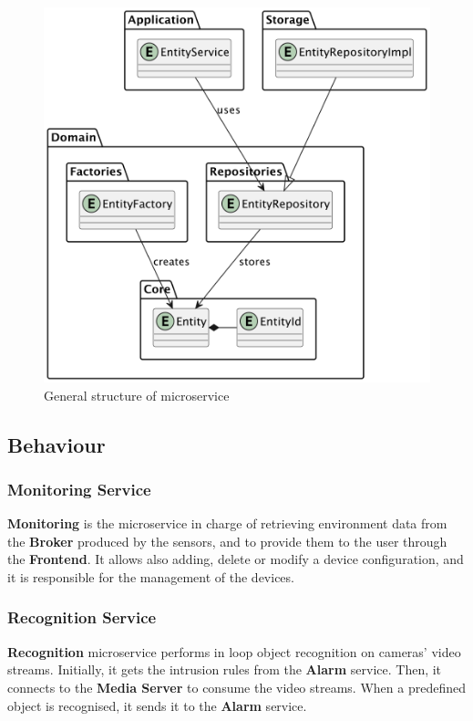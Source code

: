 \documentclass{scrartcl}
\begin{document}
    \begin{figure}
        \centering
        \includegraphics[scale=0.55]{img/general-structure}
        \caption{General structure of microservice}
        \label{fig:general-structure}
    \end{figure}

    \subsection{Behaviour}

    \subsubsection{Monitoring Service}

    \textbf{Monitoring} is the microservice in charge of retrieving environment data from the \textbf{Broker} produced by the sensors,
    and to provide them to the user through the \textbf{Frontend}.
    It allows also adding, delete or modify a device configuration, and it is responsible for the management of the devices.

    \subsubsection{Recognition Service}

    \textbf{Recognition} microservice performs in loop object recognition on cameras' video streams.
    Initially, it gets the intrusion rules from the \textbf{Alarm} service.
    Then, it connects to the \textbf{Media Server} to consume the video streams.
    When a predefined object is recognised, it sends it to the \textbf{Alarm} service.
\end{document}
